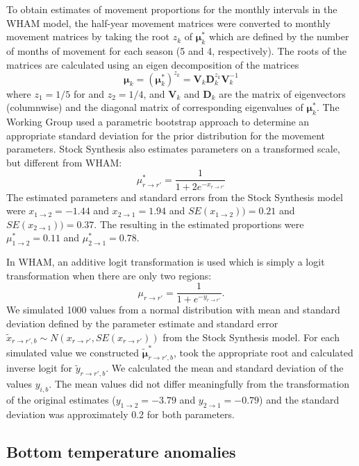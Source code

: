 \documentclass[
]{article}
\begin{document}
To obtain estimates of movement proportions for the monthly intervals in the WHAM model, the half-year movement matrices were converted to monthly movement matrices by taking the root \(z_k\) of \(\boldsymbol{\mu}^*_{k}\) which are defined by the number of months of movement for each season (5 and 4, respectively). The roots of the matrices are calculated using an eigen decomposition of the matrices
\[ \boldsymbol{\mu}_k =  \left(\boldsymbol{\mu}_k^*\right)^{z_k} = \mathbf{V}_k \mathbf{D}_k^{z_k} \mathbf{V}_k^{-1}\]
where \(z_1 = 1/5\) for and \(z_2 = 1/4\), and \(\mathbf{V}_{k}\) and \(\mathbf{D}_{k}\) are the matrix of eigenvectors (columnwise) and the diagonal matrix of corresponding eigenvalues of \(\boldsymbol{\mu}^*_k\). The Working Group used a parametric bootstrap approach to determine an appropriate standard deviation for the prior distribution for the movement parameters. Stock Synthesis also estimates parameters on a transformed scale, but different from WHAM:
\[\mu^*_{r\rightarrow r'} = \frac{1}{1 + 2e^{-x_{r\rightarrow r'}}}\]
The estimated parameters and standard errors from the Stock Synthesis model were \(x_{1\rightarrow 2}=-1.44\) and \(x_{2\rightarrow 1}=1.94\) and \(SE(x_{1\rightarrow 2})) = 0.21\) and \(SE(x_{2\rightarrow 1})) = 0.37\). The resulting in the estimated proportions were \(\mu^*_{1\rightarrow 2}=0.11\) and \(\mu^*_{2\rightarrow 1}=0.78\).

In WHAM, an additive logit transformation is used which is simply a logit transformation when there are only two regions:
\[
\mu_{r\rightarrow r'} = \frac{1}{1+e^{-y_{r\rightarrow r'}}}.
\]
We simulated 1000 values from a normal distribution with mean and standard deviation defined by the parameter estimate and standard error \(\tilde x_{{r\rightarrow r'},b} \sim N(x_{r\rightarrow r'}, SE(x_{r\rightarrow r'}))\) from the Stock Synthesis model. For each simulated value we constructed \(\tilde {\boldsymbol{\mu}}^*_{{r\rightarrow r'},b}\), took the appropriate root and calculated inverse logit for \(\tilde y_{{r\rightarrow r'},b}\). We calculated the mean and standard deviation of the values \(y_{i,b}\). The mean values did not differ meaningfully from the transformation of the original estimates (\(y_{1\rightarrow 2} = -3.79\) and \(y_{2\rightarrow 1} = -0.79\)) and the standard deviation was approximately 0.2 for both parameters.

\hypertarget{bottom-temperature-anomalies}{%
\subsection*{Bottom temperature anomalies}\label{bottom-temperature-anomalies}}
\end{document}
